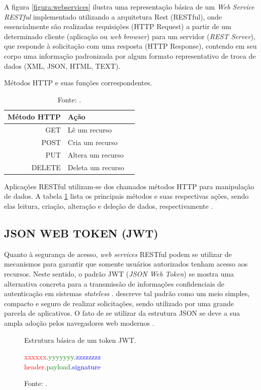 A figura \ref{figura:webservices} ilustra uma representação básica de um \textit{Web Service RESTful} implementado utilizando a arquitetura Rest (RESTful), onde essencialmente são realizadas requisições (HTTP Request) a partir de um determinado cliente (aplicação ou \textit{web browser}) para um servidor (\textit{REST Server}), que responde à solicitação com uma resposta (HTTP Response), contendo em seu corpo uma informação padronizada por algum formato representativo de troca de dados (XML, JSON, HTML, TEXT).

\begin{table}[h]
	\captionsetup{justification=centering}
	\centering
	\caption{Métodos HTTP e suas funções correspondentes.}
	\label{tabela:metodoshttp}
	\begin{tabular}{r|lr}
		Método HTTP &  Ação\\
		\hline
		GET & Lê um recurso  \\
		POST & Cria um recurso  \\
		PUT & Altera um recurso \\
		DELETE & Deleta um recurso 
	\end{tabular}
	\caption*{Fonte: .}
\end{table}

Aplicações RESTful utilizam-se dos chamados métodos HTTP para manipulação de dados. A tabela \ref{tabela:metodoshttp} lista os principais métodos e suas respectivas ações, sendo elas leitura, criação, alteração e deleção de dados, respectivamente \cite{pautasso2008restful}.

\subsection{JSON WEB TOKEN (JWT)}

Quanto à segurança de acesso, \textit{web services} RESTful podem se utilizar de mecanismos para garantir que somente usuários autorizados tenham acesso aos recursos. Neste sentido, o padrão JWT (\textit{JSON Web Token}) \cite{jwt} se mostra uma alternativa concreta para a transmissão de informações confidenciais de autenticação em sistemas \textit{stateless} \cite{jones2015json}.  descreve tal padrão como um meio simples, compacto e seguro de realizar solicitações, sendo utilizado por uma grande parcela de aplicativos. O fato de se utilizar da estrutura JSON se deve a sua ampla adoção pelos  navegadores web modernos \cite{jones2011emerging}.

\begin{figure}[h]
	\caption{Estrutura básica de um token JWT.}
	\label{figura:jwt}
	\begin{center}
		\textcolor{red}{xxxxxx}.\textcolor{green}{yyyyyyy}.\textcolor{blue}{zzzzzzzz}\\
		\textcolor{red}{header}.\textcolor{green}{payload}.\textcolor{blue}{signature}\\
	\end{center}
	\caption*{Fonte: .}
\end{figure}

